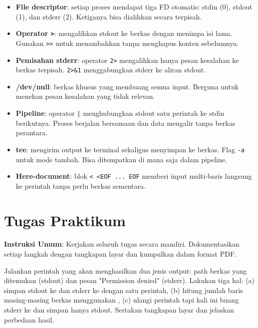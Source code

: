 \begin{itemize}[noitemsep,topsep=2pt]
    \item \textbf{File descriptor}: setiap proses mendapat tiga FD otomatis: stdin (0), stdout (1), dan stderr (2). Ketiganya bisa dialihkan secara terpisah.
    \item \textbf{Operator \texttt{>}}: mengalihkan stdout ke berkas dengan menimpa isi lama. Gunakan \texttt{>>} untuk menambahkan tanpa menghapus konten sebelumnya.
    \item \textbf{Pemisahan stderr}: operator \texttt{2>} mengalihkan hanya pesan kesalahan ke berkas terpisah. \texttt{2>\&1} menggabungkan stderr ke aliran stdout.
    \item \textbf{/dev/null}: berkas khusus yang membuang semua input. Berguna untuk menekan pesan kesalahan yang tidak relevan.
    \item \textbf{Pipeline}: operator \texttt{|} menghubungkan stdout satu perintah ke stdin berikutnya. Proses berjalan bersamaan dan data mengalir tanpa berkas perantara.
    \item \textbf{tee}: mengirim output ke terminal sekaligus menyimpan ke berkas. Flag \texttt{-a} untuk mode tambah. Bisa ditempatkan di mana saja dalam pipeline.
    \item \textbf{Here-document}: blok \texttt{<\,<EOF ... EOF} memberi input multi-baris langsung ke perintah tanpa perlu berkas sementara.
\end{itemize}

\section{Tugas Praktikum}

\textbf{Instruksi Umum}: Kerjakan seluruh tugas secara mandiri. Dokumentasikan setiap langkah dengan tangkapan layar dan kumpulkan dalam format PDF.

\begin{exercisebox}
Jalankan perintah  yang akan menghasilkan dua jenis output: path berkas yang ditemukan (stdout) dan pesan "Permission denied" (stderr). Lakukan tiga hal: (a) simpan stdout ke  dan stderr ke  dengan satu perintah, (b) hitung jumlah baris masing-masing berkas menggunakan , (c) ulangi perintah tapi kali ini buang stderr ke  dan simpan hanya stdout. Sertakan tangkapan layar dan jelaskan perbedaan hasil.
\end{exercisebox}

